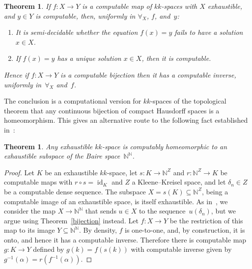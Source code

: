 \documentclass[10pt]{article}
\newcommand{\id}{\operatorname{id}}
\newtheorem{theorem}[cor]{Theorem}
\newcommand{\N}{\mathbb{N}}
\newcommand{\comp}{\circ}
\begin{document}
\begin{theorem} \label{unique:solution} \label{bijection} If $f\colon
  X \to Y$ is a computable map of $kk$-spaces with $X$ exhaustible,
  and $y \in Y$ is computable, then, uniformly in $\forall_X$, $f$,
  and~$y$:
\begin{enumerate}
\item \label{unique:solution:2} It is semi-decidable whether the
  equation $f(x) = y$ fails to have a solution $x \in X$.
\item \label{unique:solution:1} If $f(x) = y$ has a unique solution
  $x \in X$, then it is computable. 
\end{enumerate}
Hence if $f\colon X \to Y$ is a computable bijection then it has a
computable inverse, uniformly in~$\forall_X$ and~$f$.
\end{theorem}
\noindent
The conclusion is a computational version for $kk$-spaces of the
topological theorem that any continuous bijection of compact Hausdorff
spaces is a homeomorphism.
%
This gives an alternative route to the following fact
established in~\cite{escardo:exhaustible}:
\begin{theorem} \label{alternative}
  Any exhaustible $kk$-space
  is computably homeomorphic to an exhaustible subspace of the Baire
  space~$\N^\N$. 
\end{theorem}
\begin{proof}
  Let $K$ be an exhaustible $kk$-space, let $s \colon K \to \N^Z$ and
  $r \colon \N^Z \to K$ be computable maps with $r \comp s = \id_K$
  and $Z$ a Kleene--Kreisel space, and let $\delta_n \in Z$ be a
  computable dense sequence. The subspace $X = s(K) \subseteq \N^Z$,
  being a computable image of an exhaustible space, is itself
  exhaustible. As in~\cite{escardo:exhaustible}, we consider the map
  $X \to \N^\N$ that sends $u \in X$ to the
  sequence~$u(\delta_n)$, but we argue using
  Theorem~\ref{bijection} instead.  Let $f \colon X \to Y$ be the
  restriction of this map to its image $Y \subseteq \N^\N$.  By
  density, $f$ is one-to-one, and, by construction, it is onto, and
  hence it has a computable inverse. Therefore there is computable map
  $g \colon K \to Y$ defined by $g(k)=f(s(k))$ with computable inverse
  given by $g^{-1}(\alpha)=r(f^{-1}(\alpha))$.
\end{proof}
\end{document}
